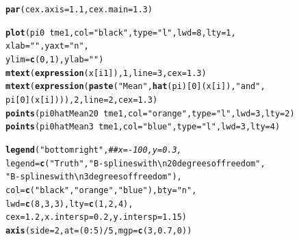 \documentclass{article}\usepackage[]{graphicx}\usepackage[]{color}
\makeatletter
\newcommand{\hlnum}[1]{\textcolor[rgb]{0.686,0.059,0.569}{#1}}%
\newcommand{\hlstr}[1]{\textcolor[rgb]{0.192,0.494,0.8}{#1}}%
\newcommand{\hlcom}[1]{\textcolor[rgb]{0.678,0.584,0.686}{\textit{#1}}}%
\newcommand{\hlopt}[1]{\textcolor[rgb]{0,0,0}{#1}}%
\newcommand{\hlstd}[1]{\textcolor[rgb]{0.345,0.345,0.345}{#1}}%
\newcommand{\hlkwc}[1]{\textcolor[rgb]{0.333,0.667,0.333}{#1}}%
\newcommand{\hlkwd}[1]{\textcolor[rgb]{0.737,0.353,0.396}{\textbf{#1}}}%
\newenvironment{kframe}{%
 \def\at@end@of@kframe{}%
 \ifinner\ifhmode%
  \def\at@end@of@kframe{\end{minipage}}%
  \begin{minipage}{\columnwidth}%
 \fi\fi%
 \def\FrameCommand##1{\hskip\@totalleftmargin \hskip-\fboxsep
 \colorbox{shadecolor}{##1}\hskip-\fboxsep
     \hskip-\linewidth \hskip-\@totalleftmargin \hskip\columnwidth}%
 \MakeFramed {\advance\hsize-\width
   \@totalleftmargin\z@ \linewidth\hsize
   \@setminipage}}%
 {\par\unskip\endMakeFramed%
 \at@end@of@kframe}
\newenvironment{knitrout}{}{} %
\makeatother
\begin{document}
\begin{knitrout}
\color{fgcolor}\begin{kframe}
\begin{alltt}
\hlkwd{par}\hlstd{(}\hlkwc{cex.axis} \hlstd{=} \hlnum{1.1}\hlstd{,} \hlkwc{cex.main}\hlstd{=}\hlnum{1.3}\hlstd{)}

\hlkwd{plot}\hlstd{(pi0} \hlopt{~} \hlstd{tme1,}\hlkwc{col}\hlstd{=}\hlstr{"black"}\hlstd{,}\hlkwc{type}\hlstd{=}\hlstr{"l"}\hlstd{,}\hlkwc{lwd}\hlstd{=}\hlnum{8}\hlstd{,} \hlkwc{lty}\hlstd{=}\hlnum{1}\hlstd{,}
     \hlkwc{xlab}\hlstd{=}\hlstr{""}\hlstd{,} \hlkwc{yaxt} \hlstd{=} \hlstr{"n"}\hlstd{,}
     \hlkwc{ylim}\hlstd{=}\hlkwd{c}\hlstd{(}\hlnum{0}\hlstd{,}\hlnum{1}\hlstd{),} \hlkwc{ylab}\hlstd{=}\hlstr{""}\hlstd{)}
\hlkwd{mtext}\hlstd{(}\hlkwd{expression}\hlstd{(x[i1]),} \hlnum{1}\hlstd{,} \hlkwc{line}\hlstd{=}\hlnum{3}\hlstd{,} \hlkwc{cex}\hlstd{=}\hlnum{1.3}\hlstd{)}
\hlkwd{mtext}\hlstd{(}\hlkwd{expression}\hlstd{(}\hlkwd{paste}\hlstd{(}\hlstr{"Mean "}\hlstd{,} \hlkwd{hat}\hlstd{(pi)[}\hlnum{0}\hlstd{](x[i]),}\hlstr{" and "}\hlstd{,}
                       \hlstd{pi[}\hlnum{0}\hlstd{](x[i]))),} \hlnum{2}\hlstd{,} \hlkwc{line}\hlstd{=}\hlnum{2}\hlstd{,} \hlkwc{cex}\hlstd{=}\hlnum{1.3}\hlstd{)}
\hlkwd{points}\hlstd{(pi0hatMean20} \hlopt{~} \hlstd{tme1,}\hlkwc{col}\hlstd{=}\hlstr{"orange"}\hlstd{,}\hlkwc{type}\hlstd{=}\hlstr{"l"}\hlstd{,}\hlkwc{lwd}\hlstd{=}\hlnum{3}\hlstd{,} \hlkwc{lty}\hlstd{=}\hlnum{2}\hlstd{)}
\hlkwd{points}\hlstd{(pi0hatMean3} \hlopt{~} \hlstd{tme1,}\hlkwc{col}\hlstd{=}\hlstr{"blue"}\hlstd{,}\hlkwc{type}\hlstd{=}\hlstr{"l"}\hlstd{,}\hlkwc{lwd}\hlstd{=}\hlnum{3}\hlstd{,} \hlkwc{lty}\hlstd{=}\hlnum{4}\hlstd{)}

\hlkwd{legend}\hlstd{(}\hlstr{"bottomright"}\hlstd{,} \hlcom{##x=-100, y=0.3, }
       \hlkwc{legend}\hlstd{=}\hlkwd{c}\hlstd{(}\hlstr{"Truth"}\hlstd{,} \hlstr{"B-splines with\textbackslash{}n20 degrees of freedom"}\hlstd{,}
                \hlstr{"B-splines with\textbackslash{}n3 degrees of freedom"}\hlstd{),}
       \hlkwc{col}\hlstd{=}\hlkwd{c}\hlstd{(}\hlstr{"black"}\hlstd{,} \hlstr{"orange"}\hlstd{,} \hlstr{"blue"}\hlstd{),} \hlkwc{bty}\hlstd{=}\hlstr{"n"}\hlstd{,}
       \hlkwc{lwd}\hlstd{=}\hlkwd{c}\hlstd{(}\hlnum{8}\hlstd{,}\hlnum{3}\hlstd{,}\hlnum{3}\hlstd{),} \hlkwc{lty}\hlstd{=}\hlkwd{c}\hlstd{(}\hlnum{1}\hlstd{,}\hlnum{2}\hlstd{,}\hlnum{4}\hlstd{),}
       \hlkwc{cex}\hlstd{=}\hlnum{1.2}\hlstd{,} \hlkwc{x.intersp}\hlstd{=}\hlnum{0.2}\hlstd{,} \hlkwc{y.intersp}\hlstd{=}\hlnum{1.15}\hlstd{)}
\hlkwd{axis}\hlstd{(}\hlkwc{side}\hlstd{=}\hlnum{2}\hlstd{,} \hlkwc{at}\hlstd{=(}\hlnum{0}\hlopt{:}\hlnum{5}\hlstd{)}\hlopt{/}\hlnum{5}\hlstd{,} \hlkwc{mgp}\hlstd{=}\hlkwd{c}\hlstd{(}\hlnum{3}\hlstd{,} \hlnum{0.7}\hlstd{,} \hlnum{0}\hlstd{))}
\end{alltt}
\end{kframe}


\end{knitrout}
\end{document}
